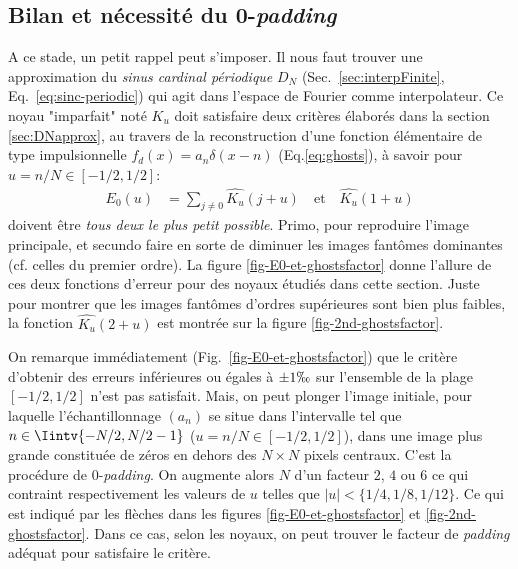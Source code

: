 \documentclass[11pt,twoside]{article}
\begin{document}
%    
%
\subsection{Bilan et nécessité du 0-\textit{padding}}
\label{sec:bilan-interpol}
%
A ce stade, un petit rappel peut s'imposer. Il nous faut trouver une approximation du \textit{sinus cardinal périodique} $D_N$ (Sec.~\ref{sec:interpFinite}, Eq.~\ref{eq:sinc-periodic}) qui agit dans l'espace de Fourier comme interpolateur. Ce noyau "imparfait" noté $K_u$ doit satisfaire deux critères élaborés dans la section \ref{sec:DNapprox}, au travers de la reconstruction d'une fonction élémentaire de type impulsionnelle $f_d(x)=a_n \delta(x-n)$ (Eq.\ref{eq:ghosts}), à savoir pour $u=n/N\in[-1/2, 1/2]$:
\begin{align}
E_0(u) &= \sum_{j\neq 0} \widehat{K_u}(j+u)
\quad \mathrm{et}\quad  \widehat{K_u}(1+u)
\label{eq:error-funct}
\end{align}
doivent être \textit{tous deux le plus petit possible}. Primo, pour reproduire l'image principale, et secundo faire en sorte de diminuer les images fantômes dominantes (cf. celles du premier ordre). La figure \ref{fig-E0-et-ghostsfactor} donne l'allure de ces deux fonctions d'erreur pour des noyaux étudiés dans cette section. 
Juste pour montrer que les images fantômes d'ordres supérieures sont bien plus faibles, la fonction $\widehat{K_u}(2+u)$ est montrée sur la figure \ref{fig-2nd-ghostsfactor}.

On remarque immédiatement (Fig.~\ref{fig-E0-et-ghostsfactor}) que le critère d'obtenir des erreurs inférieures ou égales à $\pm 1\permil$ sur l'ensemble de la plage $[-1/2, 1/2]$ n'est pas satisfait. Mais, on peut plonger l'image initiale, pour laquelle l'échantillonnage $(a_n)$  se situe dans l'intervalle tel que $n\in\Iintv{-N/2,N/2-1}$ ($u=n/N \in [-1/2,1/2]$), dans une image plus grande constituée de zéros en dehors des $N\times N$ pixels centraux. C'est la procédure de 0-\textit{padding}. On augmente alors $N$ d'un facteur $2$, $4$ ou $6$ ce qui contraint respectivement les valeurs de $u$ telles que $|u|<\{1/4,1/8,1/12\}$. Ce qui est indiqué par les flèches dans les figures  \ref{fig-E0-et-ghostsfactor} et \ref{fig-2nd-ghostsfactor}. Dans ce cas, selon les noyaux, on peut trouver le facteur de \textit{padding} adéquat pour satisfaire le critère.  
\end{document}
